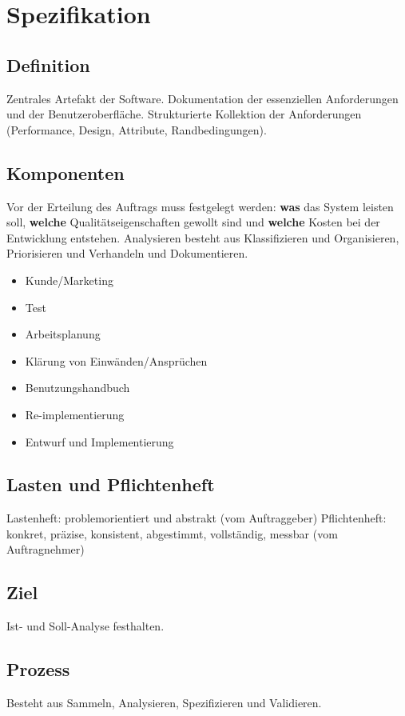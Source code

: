 \documentclass{book}
\begin{document}
    \section{Spezifikation}
    \subsection{Definition}
    Zentrales Artefakt der Software. Dokumentation der essenziellen Anforderungen und der Benutzeroberfläche.
    Strukturierte Kollektion der Anforderungen (Performance, Design, Attribute, Randbedingungen).

    \subsection{Komponenten}
    Vor der Erteilung des Auftrags muss festgelegt werden: \textbf{was} das System leisten soll, \textbf{welche} Qualitätseigenschaften gewollt sind und \textbf{welche} Kosten bei der Entwicklung entstehen.
    Analysieren besteht aus Klassifizieren und Organisieren, Priorisieren und Verhandeln und Dokumentieren.
    \begin{itemize}
        \item Kunde/Marketing
        \item Test
        \item Arbeitsplanung
        \item Klärung von Einwänden/Ansprüchen
        \item Benutzungshandbuch
        \item Re-implementierung
        \item Entwurf und Implementierung
    \end{itemize}

    \subsection{Lasten und Pflichtenheft}
    Lastenheft: problemorientiert und abstrakt (vom Auftraggeber)
    Pflichtenheft: konkret, präzise, konsistent, abgestimmt, vollständig, messbar (vom Auftragnehmer)

    \subsection{Ziel}
    Ist- und Soll-Analyse festhalten.

    \subsection{Prozess}
    Besteht aus Sammeln, Analysieren, Spezifizieren und Validieren.
\end{document}
